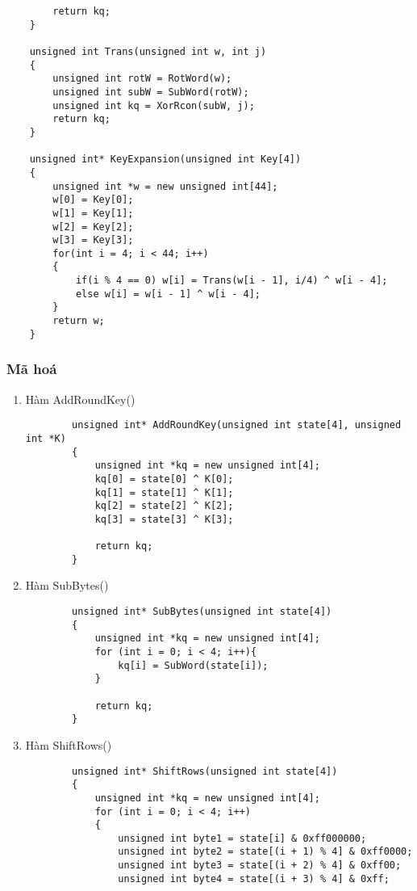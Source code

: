 \begin{verbatim}
		return kq;
	}
	
	unsigned int Trans(unsigned int w, int j)
	{
		unsigned int rotW = RotWord(w);
		unsigned int subW = SubWord(rotW);
		unsigned int kq = XorRcon(subW, j);
		return kq;
	}
	
	unsigned int* KeyExpansion(unsigned int Key[4])
	{
		unsigned int *w = new unsigned int[44];
		w[0] = Key[0]; 	
		w[1] = Key[1]; 	
		w[2] = Key[2]; 	
		w[3] = Key[3];
		for(int i = 4; i < 44; i++)
		{
			if(i % 4 == 0) w[i] = Trans(w[i - 1], i/4) ^ w[i - 4];
			else w[i] = w[i - 1] ^ w[i - 4];
		}
		return w;
	}
\end{verbatim}
\subsubsection{Mã hoá}
\begin{enumerate}
	\item Hàm AddRoundKey()
	\begin{verbatim}
		unsigned int* AddRoundKey(unsigned int state[4], unsigned int *K)
		{
			unsigned int *kq = new unsigned int[4];
			kq[0] = state[0] ^ K[0];
			kq[1] = state[1] ^ K[1];
			kq[2] = state[2] ^ K[2];
			kq[3] = state[3] ^ K[3];
			
			return kq;
		}
	\end{verbatim}
	\item Hàm SubBytes()
	\begin{verbatim}
		unsigned int* SubBytes(unsigned int state[4])
		{
			unsigned int *kq = new unsigned int[4];
			for (int i = 0; i < 4; i++){
				kq[i] = SubWord(state[i]);
			}
			
			return kq;
		}
	\end{verbatim}
	\item Hàm ShiftRows()
	\begin{verbatim}
		unsigned int* ShiftRows(unsigned int state[4])
		{
			unsigned int *kq = new unsigned int[4];
			for (int i = 0; i < 4; i++)
			{
				unsigned int byte1 = state[i] & 0xff000000;
				unsigned int byte2 = state[(i + 1) % 4] & 0xff0000;
				unsigned int byte3 = state[(i + 2) % 4] & 0xff00;
				unsigned int byte4 = state[(i + 3) % 4] & 0xff;
				

\end{verbatim}
\end{enumerate}

